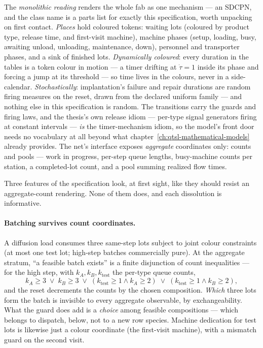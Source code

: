 The \emph{monolithic reading} renders the whole fab as one mechanism
--- an SDCPN, and the class name is a parts list for exactly this
specification, worth unpacking on first contact. \emph{Places} hold
coloured tokens: waiting lots (coloured by product type, release
time, and first-visit machine), machine phases (setup, loading, busy,
awaiting unload, unloading, maintenance, down), personnel and
transporter phases, and a sink of finished lots. \emph{Dynamically
coloured}: every duration in the tables is a token colour in motion
--- a timer drifting at $\dot\tau = 1$ inside its phase and forcing a
jump at its threshold --- so time lives in the colours, never in a
side-calendar. \emph{Stochastically}: implantation's failure and
repair durations are random firing measures on the reset, drawn from
the declared uniform family --- and nothing else in this
specification is random. The transitions carry the guards and firing
laws, and the thesis's own release idiom --- per-type signal
generators firing at constant intervals --- \emph{is} the
timer-mechanism idiom, so the model's front door needs no vocabulary
at all beyond what chapter~\ref{ch:qtsl-mathematical-models} already
provides. The net's interface exposes \emph{aggregate} coordinates
only: counts and pools --- work in progress, per-step queue lengths,
busy-machine counts per station, a completed-lot count, and a pool
summing realized flow times.

Three features of the specification look, at first sight, like they
should resist an aggregate-count rendering. None of them does, and
each dissolution is informative.

\paragraph{Batching survives count coordinates.} A diffusion load
consumes three same-step lots subject to joint colour constraints (at
most one test lot; high-step batches commercially pure). At the
aggregate stratum, ``a feasible batch exists'' is a finite
disjunction of count inequalities --- for the high step, with
$k_A, k_B, k_{\mathrm{test}}$ the per-type queue counts,
\[
  k_A \ge 3 \;\vee\; k_B \ge 3 \;\vee\;
  (k_{\mathrm{test}} \ge 1 \wedge k_A \ge 2) \;\vee\;
  (k_{\mathrm{test}} \ge 1 \wedge k_B \ge 2),
\]
and the reset decrements the counts by the chosen composition.
\emph{Which} three lots form the batch is invisible to every
aggregate observable, by exchangeability. What the guard does add is
a \emph{choice} among feasible compositions --- which belongs to
dispatch, below, not to a new row species. Machine dedication for
test lots is likewise just a colour coordinate (the first-visit
machine), with a mismatch guard on the second visit.

